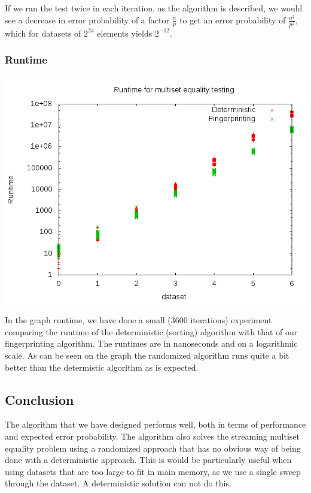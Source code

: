 \documentclass[article,a4paper,oneside]{article}
\newcommand{\+}[1]{\ensuremath{\boldsymbol{#1}}}
\begin{document}
If we ran the test twice in each iteration, as the algorithm is described, we would see a decrease in error probability of a factor $\frac{n}{p}$ to get an error probability of $\frac{n^2}{p^2}$, which for datasets of $2^{24}$ elements yields $2^{-12}$.
\subsubsection*{Runtime}
\begin{center}
	\includegraphics[scale=0.5]{runtime.png}\\
\end{center}
In the graph runtime, we have done a small (3600 iterations) experiment comparing the runtime of the deterministic (sorting) algorithm with that of our fingerprinting algorithm. The runtimes are in nanoseconds and on a logarithmic scale. As can be seen on the graph the randomized algorithm runs quite a bit better than the determistic algorithm as is expected.

\subsection*{Conclusion}
The algorithm that we have designed performs well, both in terms of performance and expected error probability. The algorithm also solves the streaming multiset equality problem using a randomized approach that has no obvious way of being done with a deterministic approach. This is would be particularly useful when using datasets that are too large to fit in main memory, as we use a single sweep through the dataset. A deterministic solution can not do this.
\end{document}
